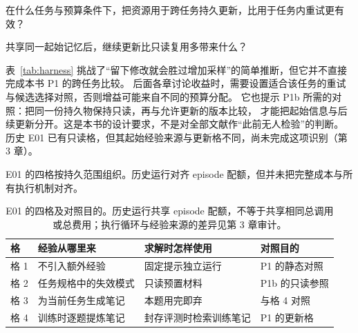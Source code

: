 \par\noindent\begin{minipage}{\linewidth}
\begin{proposition}[P1]
在什么任务与预算条件下，把资源用于跨任务持久更新，比用于任务内重试更有效？
\end{proposition}
\end{minipage}\par

\par\noindent\begin{minipage}{\linewidth}
\begin{proposition}[P1b]
共享同一起始记忆后，继续更新比只读复用多带来什么？
\end{proposition}
\end{minipage}\par

表~\ref{tab:harness} 挑战了“留下修改就会胜过增加采样”的简单推断，但它并不直接完成本书 P1 的跨任务比较。
后面各章讨论收益时，需要设置适合该任务的重试与候选选择对照，否则增益可能来自不同的预算分配。
它也提示 P1b 所需的对照：把同一份持久物保持只读，再与允许更新的版本比较，
才能把起始信息与后续更新分开。这是本书的设计要求，不是对全部文献作“此前无人检验”的判断。
历史 E01 已有只读格，但其起始经验来源与更新格不同，尚未完成这项识别（第 3 章）。

E01 的四格按持久范围组织。历史运行对齐 episode 配额，但并未把完整成本与所有执行机制对齐。

\begin{table}[htbp]
\centering
\small
\begin{tabular}{@{}p{1.2cm}p{3.6cm}p{4.6cm}p{3.4cm}@{}}
\toprule
格 & 经验从哪里来 & 求解时怎样使用 & 对照目的 \\
\midrule
格 1 & 不引入额外经验 & 固定提示独立运行 & P1 的静态对照 \\
格 2 & 任务规格中的失效模式 & 只读预置材料 & P1b 的只读参照 \\
格 3 & 为当前任务生成笔记 & 本题用完即弃 & 与格 4 对照 \\
格 4 & 训练时逐题提炼笔记 & 封存评测时检索训练笔记 & P1 的更新格 \\
\bottomrule
\end{tabular}
\caption{E01 的四格及对照目的。历史运行共享 episode 配额，不等于共享相同总调用或总费用；执行循环与经验来源的差异见第 3 章审计。}
\label{tab:grid}
\end{table}

